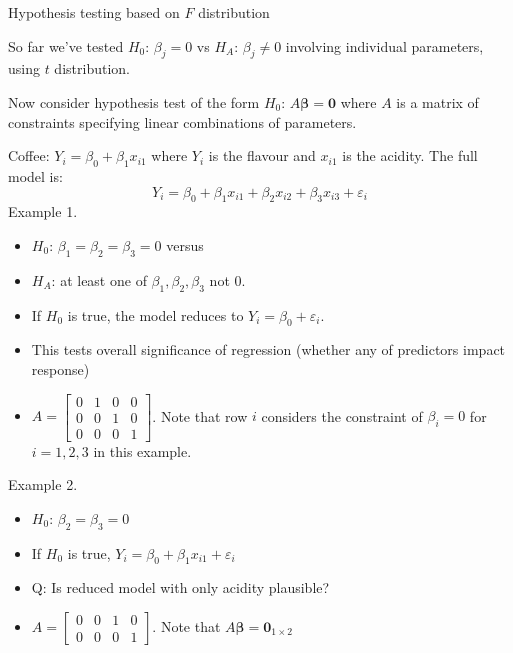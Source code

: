 Hypothesis testing based on $ F $ distribution

So far we've tested $ H_0 $: $ \beta_j=0 $
vs $ H_A $: $ \beta_j\neq 0 $
involving individual parameters,
using $ t $ distribution.

Now consider hypothesis test of the form $ H_0 $: $ A\symbf{\beta}=\symbf{0} $
where $ A $ is a matrix of constraints specifying
linear combinations of parameters.

\begin{Example}{}{}
    Coffee: $ Y_i=\beta_0+\beta_1x_{i1} $
    where $ Y_i $ is the flavour and $ x_{i1} $
    is the acidity. The full model is:
    \[ Y_i=\beta_0+\beta_1x_{i1}+\beta_2x_{i2}+\beta_3x_{i3}+\varepsilon_i \]
    Example 1.
    \begin{itemize}
        \item $ H_0 $: $ \beta_1=\beta_2=\beta_3=0 $ versus
        \item $ H_A $: at least one of $ \beta_1,\beta_2,\beta_3 $
              not 0.
        \item If $ H_0 $ is true, the model reduces to
              $ Y_i=\beta_0+\varepsilon_i $.
        \item This tests overall significance of regression
              (whether any of predictors impact response)
        \item $ A=\begin{bmatrix}
                      0 & 1 & 0 & 0 \\
                      0 & 0 & 1 & 0 \\
                      0 & 0 & 0 & 1
                  \end{bmatrix} $. Note that row $ i $ considers
              the constraint of $ \beta_i=0 $ for $ i=1,2,3 $
              in this example.
    \end{itemize}
    Example 2.
    \begin{itemize}
        \item $ H_0 $: $ \beta_2=\beta_3=0 $
        \item If $ H_0 $ is true, $ Y_i=\beta_0+\beta_1x_{i1}+\varepsilon_i $
        \item Q\@: Is reduced model with only acidity plausible?
        \item $ A=\begin{bmatrix}
                      0 & 0 & 1 & 0 \\
                      0 & 0 & 0 & 1
                  \end{bmatrix} $. Note that $ A\symbf{\beta}=\symbf{0}_{1\times 2} $

\end{itemize}
\end{Example}
